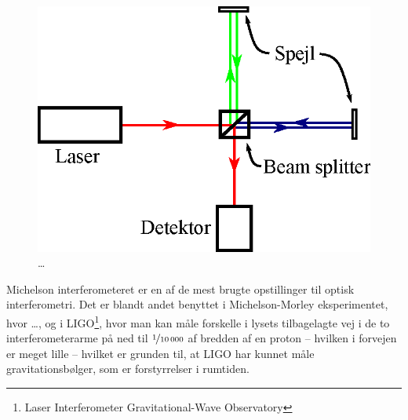 \documentclass[crop=false, class=memoir]{standalone}
\begin{document}
\begin{figure}[t]
    \centering
    \includegraphics[width=.6\textwidth]{billeder/MichelsonInterferometerGenerelt.eps}
    \caption{\ldots}
    \label{laser:fig:MichelsonInterferometerGenerelt}
\end{figure}

Michelson interferometeret er en af de mest brugte opstillinger til optisk interferometri. Det er blandt andet benyttet i Michelson-Morley eksperimentet, hvor \ldots, og i LIGO\footnote{Laser Interferometer Gravitational-Wave Observatory}, hvor man kan måle forskelle i lysets tilbagelagte vej i de to interferometerarme på ned til $\nicefrac{1}{\num{10000}}$ af bredden af en proton -- hvilken i forvejen er meget lille -- hvilket er grunden til, at LIGO har kunnet måle gravitationsbølger, som er forstyrrelser i rumtiden.
\end{document}
